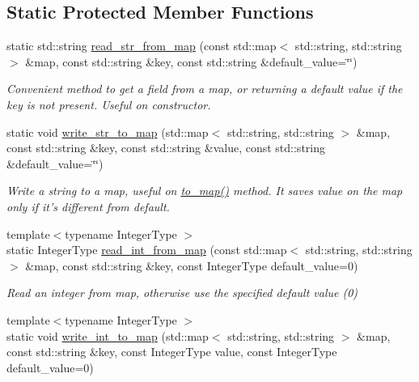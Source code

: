 \subsection*{Static Protected Member Functions}
\begin{DoxyCompactItemize}
\item 
static std\-::string \hyperlink{classredis3m_1_1patterns_1_1model_a10671593bb12a3c020e13903f72a457a}{read\-\_\-str\-\_\-from\-\_\-map} (const std\-::map$<$ std\-::string, std\-::string $>$ \&map, const std\-::string \&key, const std\-::string \&default\-\_\-value=\char`\"{}\char`\"{})
\begin{DoxyCompactList}\small\item\em Convenient method to get a field from a map, or returning a default value if the key is not present. Useful on constructor. \end{DoxyCompactList}\item 
static void \hyperlink{classredis3m_1_1patterns_1_1model_af81c69ba1d9b967af6f461fb672695db}{write\-\_\-str\-\_\-to\-\_\-map} (std\-::map$<$ std\-::string, std\-::string $>$ \&map, const std\-::string \&key, const std\-::string \&value, const std\-::string \&default\-\_\-value=\char`\"{}\char`\"{})
\begin{DoxyCompactList}\small\item\em Write a string to a map, useful on \hyperlink{classredis3m_1_1patterns_1_1model_ae5060af845197891c8f78240084e0463}{to\-\_\-map()} method. It saves value on the map only if it's different from default. \end{DoxyCompactList}\item 
{\footnotesize template$<$typename Integer\-Type $>$ }\\static Integer\-Type \hyperlink{classredis3m_1_1patterns_1_1model_a48f7240f426ef5904483ba9159b672e1}{read\-\_\-int\-\_\-from\-\_\-map} (const std\-::map$<$ std\-::string, std\-::string $>$ \&map, const std\-::string \&key, const Integer\-Type default\-\_\-value=0)
\begin{DoxyCompactList}\small\item\em Read an integer from map, otherwise use the specified default value (0) \end{DoxyCompactList}\item 
{\footnotesize template$<$typename Integer\-Type $>$ }\\static void \hyperlink{classredis3m_1_1patterns_1_1model_aee5174b2c37a0b7cd603a1b9dfc82ad2}{write\-\_\-int\-\_\-to\-\_\-map} (std\-::map$<$ std\-::string, std\-::string $>$ \&map, const std\-::string \&key, const Integer\-Type value, const Integer\-Type default\-\_\-value=0)

\end{DoxyCompactItemize}
